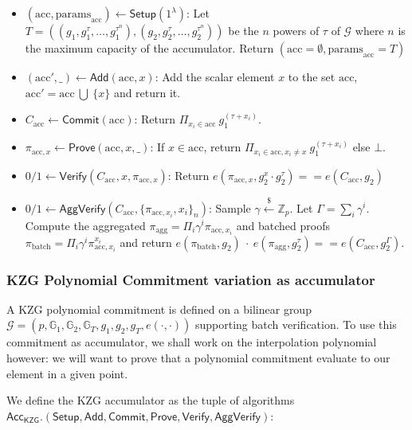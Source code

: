 \documentclass{article}
\newcommand{\isequal}{\ensuremath{==}\xspace}
\newcommand{\Zp}{\ensuremath{\mathbb{Z}_p}\xspace}
\newcommand{\G}[1]{\ensuremath{\mathbb{G}_{#1}}\xspace}
\newcommand{\e}[2]{\ensuremath{e(#1,\xspace #2)}\xspace}
\newcommand{\acc}{\ensuremath{\textrm{acc}}\xspace}
\newcommand{\pp}{\ensuremath{\textrm{params}}\xspace}
\newcommand{\Acc}{\ensuremath{\mathsf{Acc}}\xspace}
\newcommand{\Verify}{\ensuremath{\mathsf{Verify}}\xspace}
\newcommand{\AggVerify}{\ensuremath{\mathsf{AggVerify}}\xspace}
\newcommand{\Setup}{\ensuremath{\mathsf{Setup}}\xspace}
\newcommand{\Add}{\ensuremath{\mathsf{Add}}\xspace}
\newcommand{\Prove}{\ensuremath{\mathsf{Prove}}\xspace}
\newcommand{\Commit}{\ensuremath{\mathsf{Commit}}\xspace}
\newcommand{\sample}{\ensuremath{\xleftarrow{\$}}\xspace}
\begin{document}
\begin{itemize}
    \item $(\acc, \pp_\acc) \leftarrow \Setup(1^\lambda)$: Let $T = ((g_1, g_1^\tau, \dots, g_1^{\tau^n}), (g_2, g_2^\tau, \dots, g_2^{\tau^n}))$ be the $n$ powers of $\tau$ of $\mathcal{G}$ where $n$ is the maximum capacity of the accumulator. Return $(\acc =\emptyset, \pp_\acc=T)$
    \item $(\acc', \_) \leftarrow \Add(\acc, x)$: Add the scalar element $x$ to the set \acc, $\acc' = \acc\ \bigcup\ \{x\}$ and return it.
    \item $C_\acc \leftarrow \Commit(\acc)$: Return $\Pi_{x_i \in \acc}\ g_1^{(\tau + x_i)}$.
    \item $\pi_{\acc, x} \leftarrow \Prove(\acc, x, \_)$: If $x \in \acc$, return $\Pi_{x_i \in \acc, x_i \neq x}\ g_1^{(\tau + x_i)}$ else $\bot$.
    \item $0/1 \leftarrow \Verify(C_\acc, x, \pi_{\acc, x})$: Return $\e{\pi_{\acc, x}}{g_2^x \cdot g_2^\tau} \isequal \e{C_\acc}{g_2}$
    \item $0/1 \leftarrow \AggVerify(C_\acc, \{\pi_{\acc, x_i}, x_i\}_n)$:
    Sample $\gamma \sample \Zp$. Let $\Gamma = \sum_i \gamma^i$. Compute the aggregated $\pi_\text{agg} = \Pi_i \gamma^i \pi_{\acc, x_i}$ and batched proofs $\pi_\text{batch} = \Pi_i \gamma^i \pi_{\acc, x_i}^{x_i}$  and return $\e{\pi_\text{batch}}{g_2}\ \cdot\ \e{\pi_\text{agg}}{g_2^\tau} \isequal \e{C_\acc}{g_2^\Gamma}$.
\end{itemize}

%
\subsubsection{KZG Polynomial Commitment variation as accumulator}
A KZG polynomial commitment is defined on a bilinear group $\mathcal{G} = (p,\G{1}, \G{2}, \G{T}, g_1, g_2, g_T, \e{\cdot}{\cdot})$ supporting batch verification. To use this commitment as accumulator, we shall work on the interpolation polynomial however: we will want to prove that a polynomial commitment evaluate to our element in a given point.

We define the KZG accumulator as the tuple of algorithms\\ $\Acc_{\textsf{KZG}}.(\Setup, \Add, \Commit, \Prove, \Verify, \AggVerify)$:
\end{document}
